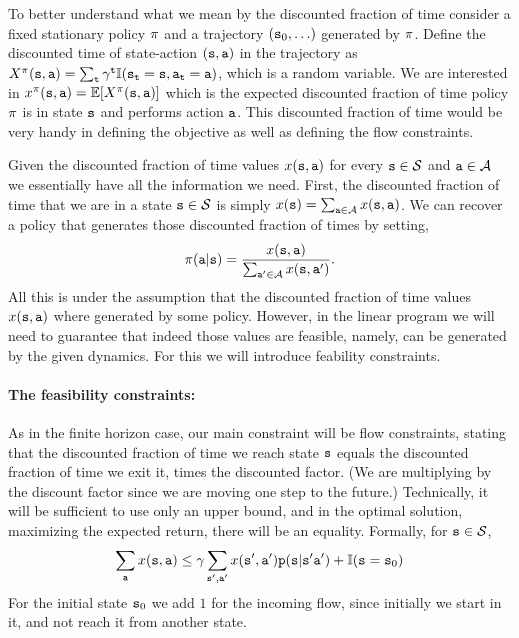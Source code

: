 To better understand what we mean by the {discounted fraction of time} consider a fixed stationary policy $\pi$ and a trajectory $({\tt s}_0, \ldots )$ generated by $\pi$. Define the discounted time of state-action $({\tt s},{\tt a})$ in the trajectory as $X^\pi({\tt s},{\tt a})=\sum_{\tt t} \gamma^{\tt t}\mathbb{I}({\tt s}_{\tt t}={\tt s},{\tt a}_{\tt t}={\tt a})$, which is a random variable. We are interested in
$x^\pi({\tt s},{\tt a})=\mathbb{E}[X^\pi({\tt s},{\tt a})]$ which is the expected discounted fraction of time policy $\pi$ is in state ${\tt s}$ and performs action ${\tt a}$.
This discounted fraction of time would be very handy in defining the objective as well as defining the flow constraints.


Given the discounted fraction of time values  $x({\tt s},{\tt a})$ for every ${\tt s}\in\mathcal{S}$ and ${\tt a}\in\mathcal{A}$ we essentially have all the information we need. First, the discounted fraction of time that we are in a state ${\tt s}\in\mathcal{S}$ is simply $x({\tt s})=\sum_{{\tt a}\in\mathcal{A}}x({\tt s},{\tt a})$.
We can recover a policy that generates those discounted fraction of times by setting,
\[
\pi({\tt a}|{\tt s})=\frac{x({\tt s},{\tt a})}{\sum_{{\tt a}'\in\mathcal{A}}x({\tt s},{\tt a}')}.
\]
All this is under the assumption that the discounted fraction of time values $x({\tt s},{\tt a})$ where generated by some policy. However, in the linear program we will need to guarantee that indeed those values are feasible, namely, can be generated by the given dynamics. For this we will introduce feability constraints.

\paragraph{The feasibility constraints:}
As in the finite horizon case, our main constraint will be flow constraints, stating that the discounted fraction of time we reach state ${\tt s}$ equals the discounted fraction of time we exit it, times the discounted factor. (We are multiplying by the discount factor since we are moving one step to the future.) Technically, it will be sufficient to use only an upper bound, and in the optimal solution, maximizing the expected return, there will be an equality. Formally, for ${\tt s}\in\mathcal{S}$,
\[
\sum_{{\tt a}} x({\tt s},{\tt a})\leq \gamma
\sum_{{\tt s}',{\tt a}'}
x({\tt s}',{\tt a}'){\tt p}({\tt s}|{\tt s}'{\tt a}')+\mathbb{I}({\tt s}={\tt s}_0)
\]
For the initial state ${\tt s}_0$ we add $1$ for the incoming flow, since initially we start in it, and not reach it from another state.

